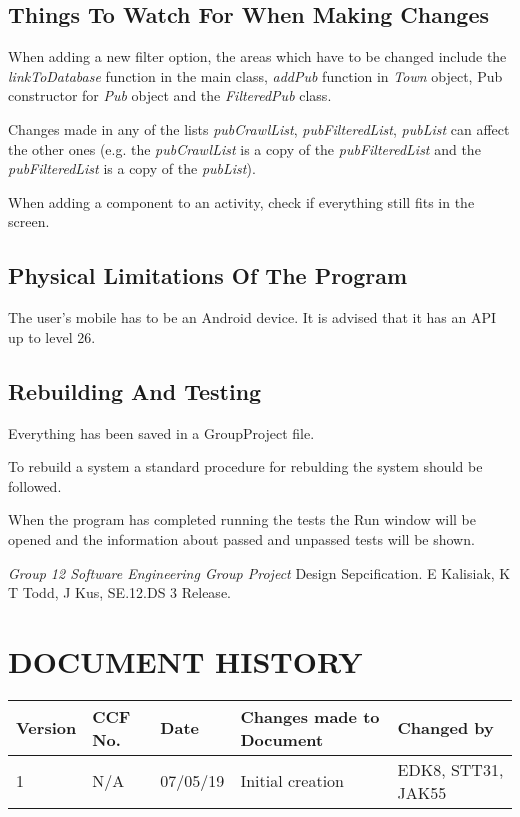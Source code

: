 \documentclass{project}
\begin{document}
\subsection{Things To Watch For When Making Changes}
When adding a new filter option, the areas which have to be changed include the \textit{linkToDatabase} function in the main class, \textit{addPub} function in \textit{Town} object, Pub constructor for \textit{Pub} object and the \textit{FilteredPub} class. \par
Changes  made in any of the lists \textit{pubCrawlList}, \textit{pubFilteredList}, \textit{pubList} can affect the other ones (e.g. the \textit{pubCrawlList} is a copy of the \textit{pubFilteredList} and the \textit{pubFilteredList} is a copy of the \textit{pubList}). \par
When adding a component to an activity, check if everything still fits in the screen.

\subsection{Physical Limitations Of The Program}
The user's mobile has to be an Android device. It is advised that it has an API up to level 26.\par

\subsection{Rebuilding And Testing}
Everything has been saved in a GroupProject file. \par
To rebuild a system a standard procedure for rebulding the system should be followed.\par
When the program has completed running the tests the Run window will be opened and the information about passed and unpassed tests will be shown. \par

\begin{thebibliography}{5}
 \emph{Group 12 Software Engineering Group Project}
Design Sepcification.
E Kalisiak, K T Todd, J Kus, SE.12.DS 3 Release.
\end{thebibliography}
\section*{DOCUMENT HISTORY}
\begin{tabular}{|l | l | l | l | l |}
\hline
Version & CCF No. & Date & Changes made to Document & Changed by \\
\hline
1 & N/A & 07/05/19 & Initial creation & EDK8, STT31, JAK55 \\
\hline
\end{tabular}
\label{thelastpage}
\end{document}
